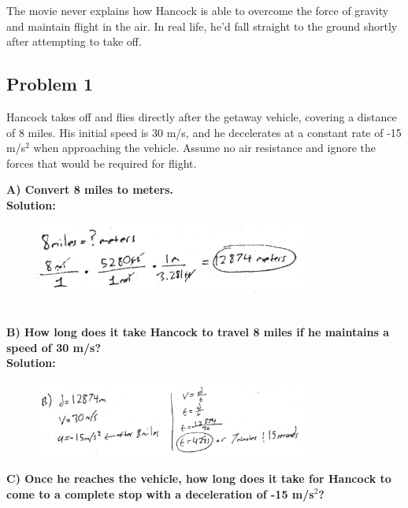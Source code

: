 \documentclass[a4paper,12pt]{article}
\begin{document}
The movie never explains how Hancock is able to overcome the force of gravity
	and maintain flight in the air. In real life, he’d fall straight to the ground
	shortly after attempting to take off.

\subsection{Problem 1}
Hancock takes off and flies directly after the getaway vehicle, covering a distance of 8 miles. His initial speed is 30 m/s, and he decelerates at a constant rate of -15 m/s$^2$ when approaching the vehicle. Assume no air resistance and ignore the forces that would be required for flight. 


\noindent\textbf{A) Convert 8 miles to meters.} \\

\noindent\textbf{Solution:}

\begin{figure}[H]
    \centering
    \includegraphics[width=0.8\textwidth]{U1_P1_A} %
\end{figure} \\


\noindent\textbf{B) How long does it take Hancock to travel 8 miles if he maintains a speed of 30 m/s?} \\

\noindent\textbf{Solution:}

\begin{figure}[H]
    \centering
    \includegraphics[width=0.8\textwidth]{U1_P1_B} %
\end{figure}


\noindent\textbf{C) Once he reaches the vehicle, how long does it take for Hancock to come to a complete stop with a deceleration of -15 m/s$^2$?} \\
\end{document}
